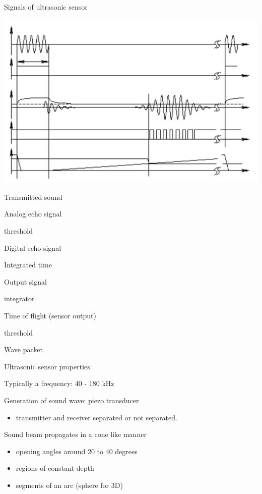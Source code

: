 \documentclass[compress]{beamer}
\begin{document}
\begin{frame}{Signals of ultrasonic sensor}

\begin{center}
    \includegraphics[width=0.8\linewidth]{us_signals}

\end{center}
Transmitted sound

Analog echo signal

threshold

Digital echo signal

Integrated time

Output signal

integrator

Time of flight (sensor output)

threshold

Wave packet

\end{frame}

\begin{frame}{Ultrasonic sensor properties}

Typically a frequency: 40 - 180 kHz

Generation of sound wave: piezo transducer

\begin{itemize}

\item
  transmitter and receiver separated or not separated.
\end{itemize}

Sound beam propagates in a cone like manner

\begin{itemize}

\item
  opening angles around 20 to 40 degrees
\item
  regions of constant depth
\item
  segments of an arc (sphere for 3D)
\end{itemize}

\end{frame}
\end{document}
